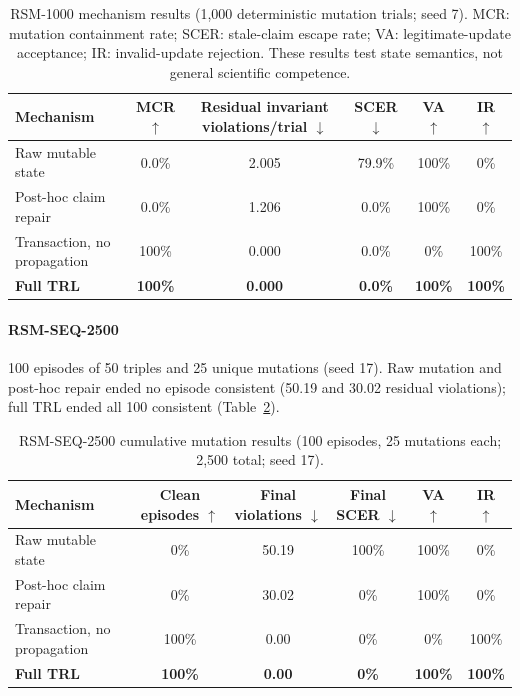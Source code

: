 \documentclass[journal]{IEEEtran}
\begin{document}
\begin{table}[!t]
\centering
\caption{RSM-1000 mechanism results (1,000 deterministic mutation trials; seed 7). MCR: mutation containment rate; SCER: stale-claim escape rate; VA: legitimate-update acceptance; IR: invalid-update rejection. These results test state semantics, not general scientific competence.}
\label{tab:rsm}
\begin{tabular}{lccccc}
\toprule
Mechanism & MCR $\uparrow$ & Residual invariant violations/trial $\downarrow$ & SCER $\downarrow$ & VA $\uparrow$ & IR $\uparrow$ \\
\midrule
Raw mutable state & 0.0\% & 2.005 & 79.9\% & 100\% & 0\% \\
Post-hoc claim repair & 0.0\% & 1.206 & 0.0\% & 100\% & 0\% \\
Transaction, no propagation & 100\% & 0.000 & 0.0\% & 0\% & 100\% \\
\textbf{Full TRL} & \textbf{100\%} & \textbf{0.000} & \textbf{0.0\%} & \textbf{100\%} & \textbf{100\%} \\
\bottomrule
\end{tabular}
\end{table}

\paragraph{RSM-SEQ-2500} 100 episodes of 50 triples and 25 unique mutations (seed 17). Raw mutation and post-hoc repair ended no episode consistent (50.19 and 30.02 residual violations); full TRL ended all 100 consistent (Table~\ref{tab:rsm_seq}).

\begin{table}[!t]
\centering
\caption{RSM-SEQ-2500 cumulative mutation results (100 episodes, 25 mutations each; 2,500 total; seed 17).}
\label{tab:rsm_seq}
\begin{tabular}{lccccc}
\toprule
Mechanism & Clean episodes $\uparrow$ & Final violations $\downarrow$ & Final SCER $\downarrow$ & VA $\uparrow$ & IR $\uparrow$ \\
\midrule
Raw mutable state & 0\% & 50.19 & 100\% & 100\% & 0\% \\
Post-hoc claim repair & 0\% & 30.02 & 0\% & 100\% & 0\% \\
Transaction, no propagation & 100\% & 0.00 & 0\% & 0\% & 100\% \\
\textbf{Full TRL} & \textbf{100\%} & \textbf{0.00} & \textbf{0\%} & \textbf{100\%} & \textbf{100\%} \\
\bottomrule
\end{tabular}
\end{table}
\end{document}
